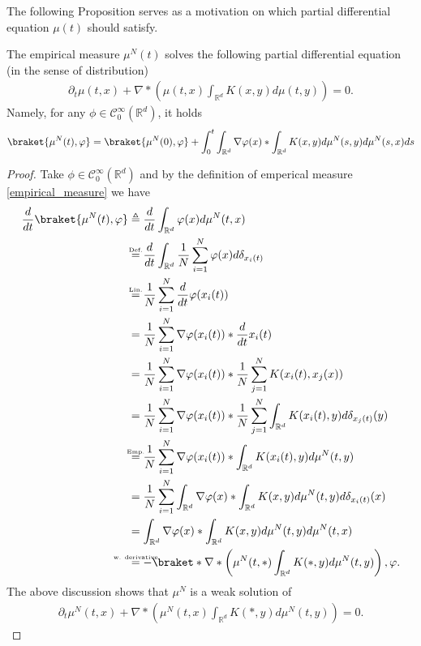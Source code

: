 \vskip5mm
The following Proposition serves as a motivation on which partial differential equation $\mu(t)$ should satisfy.
\begin{prop}
 The empirical measure $\mu^N(t)$ solves the following partial differential equation (in the sense of distribution)
\begin{align*}
  \partial_t \mu(t,x) + \nabla * \left( \mu(t,x) \int_{\mathbb{R}^{d} } K(x,y) d\mu(t,y) \right)  = 0
.\end{align*}  
Namely, for any $\phi  \in  \mathcal{C}_0^{\infty}(\mathbb{R}^{d} )$, it holds
\begin{align*}
\braket{\mu^N(t),\phi }=\braket{\mu^N(0),\phi }+\int^t_0  \int_{\mathbb{R}^{d} } \nabla \phi (x) * \int_{\mathbb{R}^{d} } K(x,y) d\mu^N(s,y)d\mu^N(s,x) ds
\end{align*}
\end{prop}
\begin{proof}
  Take $\phi  \in  \mathcal{C}_0^{\infty}(\mathbb{R}^{d} ) $ and by the definition of emperical measure \autoref{empirical_measure} we have
\begin{align*}
  \frac{d}{dt} \braket{\mu^N(t),\phi } &\triangleq \frac{d}{dt} \int_{\mathbb{R}^{d} } \phi(x) d\mu^N(t,x)  \\
                                       &\myS{Def.}{=} \frac{d}{dt} \int_{\mathbb{R}^{d} } \frac{1}{N} \sum_{i=1}^{N} \phi(x)d\delta_{x_{i}(t)}\\
                                       &\myS{Lin.}{=} \frac{1}{N} \sum_{i=1}^{N}  \frac{d}{dt} \phi (x_i(t))\\
                                       &= \frac{1}{N} \sum_{i=1}^{N} \nabla \phi(x_i(t)) *\frac{d}{dt} x_i(t)\\
                                       &= \frac{1}{N} \sum_{i=1}^{N} \nabla \phi(x_i(t)) *\frac{1}{N}\sum_{j=1}^{N} K(x_{i}(t),x_{j}(x)) \\
                                       &= \frac{1}{N} \sum_{i=1}^{N} \nabla \phi(x_i(t)) *\frac{1}{N}\sum_{j=1}^{N} \int_{\mathbb{R}^{d}} K(x_{i}(t),y) d \delta_{x_j(t)}(y) \\ 
                                       &\myS{Emp.}{=}  \frac{1}{N} \sum_{i=1}^{N} \nabla \phi(x_i(t)) * \int_{\mathbb{R}^{d}} K(x_{i}(t),y) d\mu^{N}(t,y) \\ 
                                       &= \frac{1}{N} \sum_{i=1}^{N} \int_{\mathbb{R}^{d} } \nabla \phi(x) * \int_{\mathbb{R}^{d} } K(x,y) d\mu^N(t,y) d\delta_{x_i(t)}(x)\\
                                       &= \int_{\mathbb{R}^{d} } \nabla \phi (x) * \int_{\mathbb{R}^{d} } K(x,y) d\mu^N(t,y)d\mu^N(t,x)\\
                                       &\myS{w. derivative}{=} -\braket*{\nabla*\left(\mu^N(t,*)\int_{\mathbb{R}^{d}}K(*,y) d\mu^N(t,y) \right),\phi }
.\end{align*}  
The above discussion shows that $\mu^N$ is a weak solution of
\begin{align*}
  \partial_t \mu^N(t,x) + \nabla * \left( \mu^N(t,x) \int_{\mathbb{R}^{d} } K(*,y) d\mu^N(t,y) \right)  = 0
.\end{align*}  
\end{proof}

